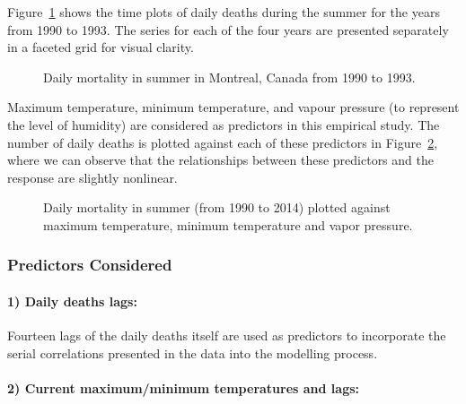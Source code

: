 \documentclass[
  11pt,
  a4paper,
]{report}
\begin{document}
Figure~\ref{fig-deaths} shows the time plots of daily deaths during the
summer for the years from 1990 to 1993. The series for each of the four
years are presented separately in a faceted grid for visual clarity.

\begin{figure}


\caption{\label{fig-deaths}Daily mortality in summer in Montreal, Canada
from 1990 to 1993.}

\end{figure}%

Maximum temperature, minimum temperature, and vapour pressure (to
represent the level of humidity) are considered as predictors in this
empirical study. The number of daily deaths is plotted against each of
these predictors in Figure~\ref{fig-Tmax}, where we can observe that the
relationships between these predictors and the response are slightly
nonlinear.

\begin{figure}


\caption{\label{fig-Tmax}Daily mortality in summer (from 1990 to 2014)
plotted against maximum temperature, minimum temperature and vapor
pressure.}

\end{figure}%

\pagebreak[3]

\subsubsection{Predictors Considered}\label{predictors-considered}

\paragraph{1) Daily deaths lags:}\label{daily-deaths-lags}

Fourteen lags of the daily deaths itself are used as predictors to
incorporate the serial correlations presented in the data into the
modelling process.

\paragraph{2) Current maximum/minimum temperatures and
lags:}\label{current-maximumminimum-temperatures-and-lags}
\end{document}
